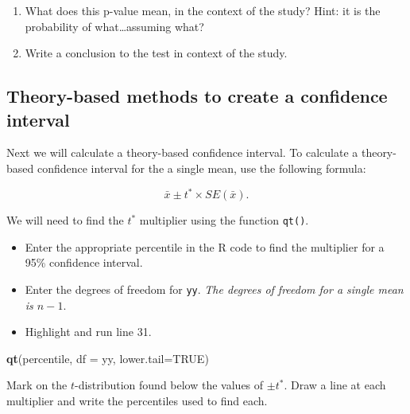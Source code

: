 \documentclass[
]{report}
\newenvironment{Shaded}{\begin{snugshade}}{\end{snugshade}}
\newcommand{\AttributeTok}[1]{\textcolor[rgb]{0.13,0.29,0.53}{#1}}
\newcommand{\ConstantTok}[1]{\textcolor[rgb]{0.56,0.35,0.01}{#1}}
\newcommand{\FunctionTok}[1]{\textcolor[rgb]{0.13,0.29,0.53}{\textbf{#1}}}
\newcommand{\NormalTok}[1]{#1}
\begin{document}
\begin{enumerate}
\def\labelenumi{\arabic{enumi}.}
\setcounter{enumi}{4}
\item
  What does this p-value mean, in the context of the study? Hint: it is the probability of what\ldots assuming what?
  \vspace{0.8in}
\item
  Write a conclusion to the test in context of the study.
\end{enumerate}

\vspace{0.6in}

\subsection*{Theory-based methods to create a confidence interval}\label{theory-based-methods-to-create-a-confidence-interval}

Next we will calculate a theory-based confidence interval. To calculate a theory-based confidence interval for the a single mean, use the following formula:

\[\bar{x}\pm t^* \times SE(\bar{x}).\]

We will need to find the \(t^*\) multiplier using the function \texttt{qt()}.

\begin{itemize}
\item
  Enter the appropriate percentile in the R code to find the multiplier for a 95\% confidence interval.
\item
  Enter the degrees of freedom for \texttt{yy}. \emph{The degrees of freedom for a single mean is \(n-1\)}.
\item
  Highlight and run line 31.
\end{itemize}

\begin{Shaded}
\begin{Highlighting}[]
\FunctionTok{qt}\NormalTok{(percentile, }\AttributeTok{df =}\NormalTok{ yy, }\AttributeTok{lower.tail=}\ConstantTok{TRUE}\NormalTok{)}
\end{Highlighting}
\end{Shaded}

Mark on the \(t\)-distribution found below the values of \(\pm t^*\). Draw a line at each multiplier and write the percentiles used to find each.
\vspace{1mm}
\end{document}
